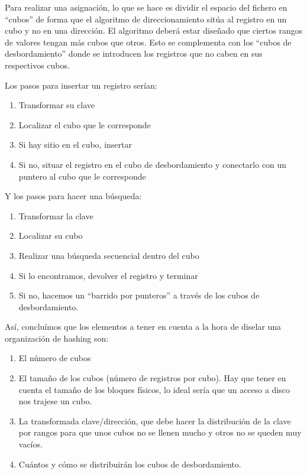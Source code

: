 \documentclass[10pt,a4paper,spanish]{report}
\begin{document}
Para realizar una asignación, lo que se hace es dividir el espacio del fichero en ``cubos'' de forma que el algoritmo de direccionamiento sitúa al registro en un cubo y no en una dirección. El algoritmo deberá estar diseñado que ciertos rangos de valores tengan más cubos que otros. Esto se complementa con los ``cubos de desbordamiento'' donde se introducen los registros que no caben en sus respectivos cubos.

Los pasos para insertar un registro serían:
\begin{enumerate}
    \item Transformar su clave
    \item Localizar el cubo que le corresponde
    \item Si hay sitio en el cubo, insertar
    \item Si no, situar el registro en el cubo de desbordamiento y conectarlo con un puntero al cubo que le corresponde
\end{enumerate}

Y los pasos para hacer una búsqueda:
\begin{enumerate}
    \item Transformar la clave
    \item Localizar su cubo
    \item Realizar una búsqueda secuencial dentro del cubo
    \item Si lo encontramos, devolver el registro y terminar
    \item Si no, hacemos un ``barrido por punteros'' a través de los cubos de desbordamiento.
\end{enumerate}

Así, concluímos que los elementos a tener en cuenta a la hora de diselar una organización de hashing son:
\begin{enumerate}[$\heartsuit$]
    \item El número de cubos
    \item El tamaño de los cubos (número de registros por cubo). Hay que tener en cuenta el tamaño de los bloques físicos, lo ideal sería que un acceso a disco nos trajese un cubo.
    \item La transformada clave/dirección, que debe hacer la distribución de la clave por rangos para que unos cubos no se llenen mucho y otros no se queden muy vacíos.
    \item Cuántos y cómo se distribuirán los cubos de desbordamiento.
\end{enumerate}
\end{document}

